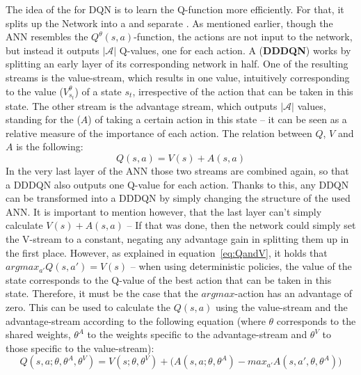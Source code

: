 The idea of the \cite{wang_dueling_2015} for DQN is to learn the Q-function more efficiently. For that, it splits up the Network into a  and separate . As mentioned earlier, though the ANN resembles the $Q^\theta(s,a)$-function, the actions are not input to the network, but instead it outputs $|\mathcal{A}|$ Q-values, one for each action. A  (\textbf{DDDQN}) works by splitting an early layer of its corresponding network in half. One of the resulting streams is the value-stream, which results in one value, intuitively corresponding to the value ($V^\theta_{s_t}$) of a state $s_t$, irrespective of the action that can be taken in this state. The other stream is  the advantage stream, which outputs $|\mathcal{A}|$ values, standing for the  ($A$) of taking a certain action in this state -- it can be seen as a relative measure of the importance of each action. The relation between $Q$, $V$ and $A$ is the following:
\begin{equation*}
	Q(s,a) = V(s) + A(s,a)
\end{equation*}
In the very last layer of the ANN those two streams are combined again, so that a DDDQN also outputs one Q-value for each action. Thanks to this, any DDQN can be transformed into a DDDQN by simply changing the structure of the used ANN. It is important to mention however, that the last layer can't simply calculate $V(s) + A(s,a)$ -- If that was done, then the network could simply set the V-stream to a constant, negating any advantage gain in splitting them up in the first place. However, as explained in equation~\ref{eq:QandV}, it holds that $argmax_{a'}Q(s,a') = V(s)$ -- when using deterministic policies, the value of the state corresponds to the Q-value of the best action that can be taken in this state. Therefore, it must be the case that the $argmax$-action has an advantage of zero. This can be used to calculate the $Q(s,a)$ using the value-stream and the advantage-stream according to the following equation (where $\theta$ corresponds to the shared weights, $\theta^A$ to the weights specific to the advantage-stream and $\theta^V$ to those specific to the value-stream):
\begin{equation*}
	Q(s,a; \theta, \theta^A, \theta^V) = V(s; \theta, \theta^V) + \big( A(s,a; \theta, \theta^A) - max_{a'}A(s,a',\theta, \theta^A) \big)
\end{equation*}
